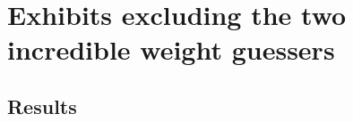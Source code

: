 
\clearpage
\section*{Exhibits excluding the two incredible weight guessers}

\clearpage
\subsection*{Results}

